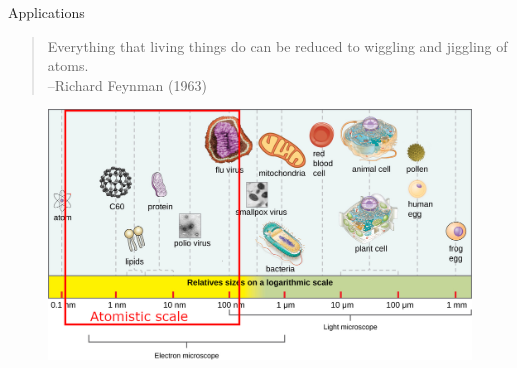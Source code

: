 \documentclass{beamer}
\begin{document}


\begin{frame}{Applications} 
\begin{quote}
	Everything that living things do can be reduced to wiggling and jiggling of atoms. 
	\\ \hfill --Richard Feynman (1963)
\end{quote}
\vspace{-.5cm}
\begin{figure}
	\includegraphics[width=.9\linewidth]{Pics/scale_comm.jpg}
\end{figure}
\end{frame}
	
%
%
\end{document}
